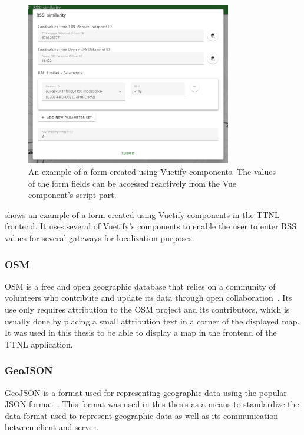 \begin{figure}[htbp]
    \centering
    \includegraphics[width=0.8\textwidth]{pictures/ttn-locator/frontend/vuetify-form-example.png}
    \caption{
        An example of a form created using Vuetify components.
        The values of the form fields can be accessed reactively from the Vue component's script part.
    }\label{fig:vuetify-form-example}
\end{figure}

 shows an example of a form created using Vuetify components in the \ac{TTNL} frontend.
It uses several of Vuetify's components to enable the user to enter \ac{RSS} values for several gateways for localization purposes.

\subsubsection{\acf{OSM}}\label{sec:osm}

\ac{OSM} is a free and open geographic database that relies on a community of volunteers who contribute and update its data through open collaboration~\cite{openstreetmap_contributors_openstreetmap_2023}.
Its use only requires attribution to the \ac{OSM} project and its contributors, which is usually done by placing a small attribution text in a corner of the displayed map.
It was used in this thesis to be able to display a map in the frontend of the \ac{TTNL} application.

\subsubsection{GeoJSON}\label{sec:geojson}

GeoJSON is a format used for representing geographic data using the popular \ac{JSON} format~\cite{butler_geojson_2016}.
This format was used in this thesis as a means to standardize the data format used to represent geographic data as well as its communication between client and server.

